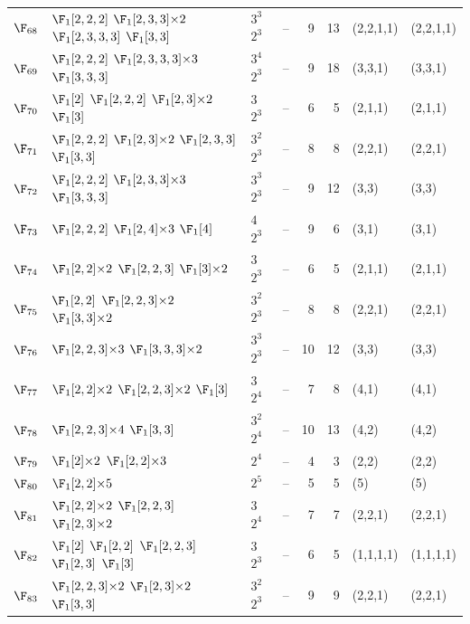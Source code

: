 \begin{landscape}
{\begin{longtable}{@{}l p{8.2cm} l l r r l l@{}}
$\F_{68}$ & $\F_{1}[2,2,2]$\; $\F_{1}[2,3,3]{\times}2$\; $\F_{1}[2,3,3,3]$\; $\F_{1}[3,3]$ & $3^{3}$\,$2^{3}$ & -- & 9 & 13 & (2,2,1,1) & (2,2,1,1) \\
$\F_{69}$ & $\F_{1}[2,2,2]$\; $\F_{1}[2,3,3,3]{\times}3$\; $\F_{1}[3,3,3]$ & $3^{4}$\,$2^{3}$ & -- & 9 & 18 & (3,3,1) & (3,3,1) \\
$\F_{70}$ & $\F_{1}[2]$\; $\F_{1}[2,2,2]$\; $\F_{1}[2,3]{\times}2$\; $\F_{1}[3]$ & $3$\,$2^{3}$ & -- & 6 & 5 & (2,1,1) & (2,1,1) \\
$\F_{71}$ & $\F_{1}[2,2,2]$\; $\F_{1}[2,3]{\times}2$\; $\F_{1}[2,3,3]$\; $\F_{1}[3,3]$ & $3^{2}$\,$2^{3}$ & -- & 8 & 8 & (2,2,1) & (2,2,1) \\
$\F_{72}$ & $\F_{1}[2,2,2]$\; $\F_{1}[2,3,3]{\times}3$\; $\F_{1}[3,3,3]$ & $3^{3}$\,$2^{3}$ & -- & 9 & 12 & (3,3) & (3,3) \\
$\F_{73}$ & $\F_{1}[2,2,2]$\; $\F_{1}[2,4]{\times}3$\; $\F_{1}[4]$ & $4$\,$2^{3}$ & -- & 9 & 6 & (3,1) & (3,1) \\
$\F_{74}$ & $\F_{1}[2,2]{\times}2$\; $\F_{1}[2,2,3]$\; $\F_{1}[3]{\times}2$ & $3$\,$2^{3}$ & -- & 6 & 5 & (2,1,1) & (2,1,1) \\
$\F_{75}$ & $\F_{1}[2,2]$\; $\F_{1}[2,2,3]{\times}2$\; $\F_{1}[3,3]{\times}2$ & $3^{2}$\,$2^{3}$ & -- & 8 & 8 & (2,2,1) & (2,2,1) \\
$\F_{76}$ & $\F_{1}[2,2,3]{\times}3$\; $\F_{1}[3,3,3]{\times}2$ & $3^{3}$\,$2^{3}$ & -- & 10 & 12 & (3,3) & (3,3) \\
$\F_{77}$ & $\F_{1}[2,2]{\times}2$\; $\F_{1}[2,2,3]{\times}2$\; $\F_{1}[3]$ & $3$\,$2^{4}$ & -- & 7 & 8 & (4,1) & (4,1) \\
$\F_{78}$ & $\F_{1}[2,2,3]{\times}4$\; $\F_{1}[3,3]$ & $3^{2}$\,$2^{4}$ & -- & 10 & 13 & (4,2) & (4,2) \\
$\F_{79}$ & $\F_{1}[2]{\times}2$\; $\F_{1}[2,2]{\times}3$ & $2^{4}$ & -- & 4 & 3 & (2,2) & (2,2) \\
$\F_{80}$ & $\F_{1}[2,2]{\times}5$ & $2^{5}$ & -- & 5 & 5 & (5) & (5) \\
$\F_{81}$ & $\F_{1}[2,2]{\times}2$\; $\F_{1}[2,2,3]$\; $\F_{1}[2,3]{\times}2$ & $3$\,$2^{4}$ & -- & 7 & 7 & (2,2,1) & (2,2,1) \\
$\F_{82}$ & $\F_{1}[2]$\; $\F_{1}[2,2]$\; $\F_{1}[2,2,3]$\; $\F_{1}[2,3]$\; $\F_{1}[3]$ & $3$\,$2^{3}$ & -- & 6 & 5 & (1,1,1,1) & (1,1,1,1) \\
$\F_{83}$ & $\F_{1}[2,2,3]{\times}2$\; $\F_{1}[2,3]{\times}2$\; $\F_{1}[3,3]$ & $3^{2}$\,$2^{3}$ & -- & 9 & 9 & (2,2,1) & (2,2,1) \\

\end{longtable}}
\end{landscape}
